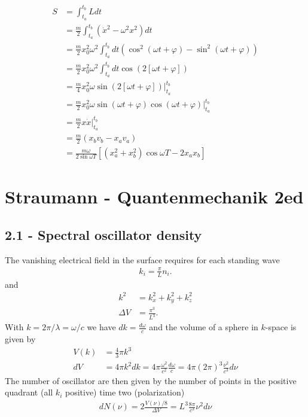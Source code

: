\documentclass[10pt,a4paper]{book}
\theoremstyle{definition}
\begin{document}
\begin{align}
    S&=\int_{t_a}^{t_b}L dt\\
    &=\frac{m}{2}\int_{t_a}^{t_b}(\dot x^2-\omega^2x^2) dt\\
    &=\frac{m}{2}x_0^2\omega^2\int_{t_a}^{t_b}dt\left(\cos^2(\omega t+\varphi)-\sin^2(\omega t+\varphi)\right)\\
    &=\frac{m}{2}x_0^2\omega^2\int_{t_a}^{t_b}dt\cos(2[\omega t+\varphi])\\
    &=\frac{m}{4}x_0^2\omega\sin(2[\omega t+\varphi])|_{t_a}^{t_b}\\
    &=\frac{m}{2}x_0^2\omega\sin(\omega t+\varphi)\cos(\omega t+\varphi)|_{t_a}^{t_b}\\
    &=\frac{m}{2} x \dot x|_{t_a}^{t_b}\\
    &=\frac{m}{2}(x_bv_b-x_av_a)\\
    &=\frac{m\omega}{2\sin\omega T}\left[(x_a^2+x_b^2)\cos\omega T-2x_ax_b\right]
\end{align}

\section{{\sc Straumann} - Quantenmechanik 2ed}
\subsection{2.1 - Spectral oscillator density}
The vanishing electrical field in the surface requires for each standing wave
\begin{align}
    k_i=\frac{\pi}{L}n_i. 
\end{align}
and
\begin{align}
    k^2&=k_x^2+k_y^2+k_z^2\\
    \Delta V&=\frac{\pi^3}{L^3}.
\end{align}
With $k=2\pi/\lambda = \omega/c$ we have $dk=\frac{d\omega}{c}$ and the volume of a sphere in $k$-space is given by
\begin{align}
    V(k)&=\frac{4}{3}\pi k^3\\
    dV&=4\pi k^2 dk=4\pi \frac{\omega^2}{c^2} \frac{d\omega}{c} 
    =4\pi (2\pi)^3\frac{\nu^2}{c^3} d\nu 
\end{align}
The number of oscillator are then given by the number of points in the positive quadrant (all $k_i$ positive) time two (polarization)
\begin{align}
    dN(\nu)=2\frac{V(\nu)/8}{\Delta V}=L^3 \frac{8\pi}{c^3}\nu^2d\nu
\end{align}
\end{document}
